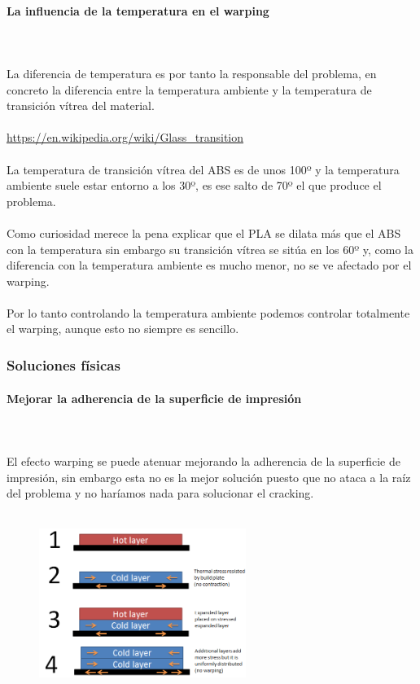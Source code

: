 \documentclass[11pt,a4paper]{article}
\begin{document}
			\paragraph{La influencia de la temperatura en el warping}\mbox{}\\\\
La diferencia de temperatura es por tanto la responsable del problema, en concreto la diferencia entre la temperatura ambiente y la temperatura de transición vítrea del material.
\\\\
\url{https://en.wikipedia.org/wiki/Glass_transition}
\\\\
La temperatura de transición vítrea del ABS es de unos 100º y la temperatura ambiente suele estar entorno a los 30º, es ese salto de 70º el que produce el problema.
\\\\
Como curiosidad merece la pena explicar que el PLA se dilata más que el ABS con la temperatura sin embargo su transición vítrea se sitúa en los 60º y, como la diferencia con la temperatura ambiente es mucho menor, no se ve afectado por el warping.
\\\\
Por lo tanto controlando la temperatura ambiente podemos controlar totalmente el warping, aunque esto no siempre es sencillo.
		\subsubsection{Soluciones físicas}
			\paragraph{Mejorar la adherencia de la superficie de impresión}\mbox{}\\\\
El efecto warping se puede atenuar mejorando la adherencia de la superficie de impresión, sin embargo esta no es la mejor solución puesto que no ataca a la raíz del problema y no haríamos nada para solucionar el cracking.
\\\\
\begin{figure}[H]
\centering
\includegraphics[width=0.6\textwidth,cfbox=azul_marcos 4pt 0pt]{FOTOS/CAUSA_WARPING_2}
\end{figure}
\end{document}
